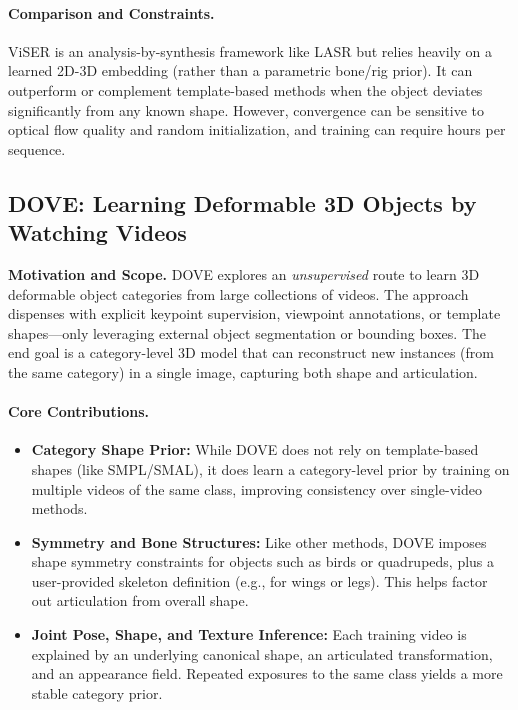 \documentclass[11pt]{article}
\begin{document}
\paragraph{Comparison and Constraints.}
ViSER is an analysis-by-synthesis framework like LASR but relies heavily on a learned 2D-3D embedding (rather than a parametric bone/rig prior). It can outperform or complement template-based methods when the object deviates significantly from any known shape. However, convergence can be sensitive to optical flow quality and random initialization, and training can require hours per sequence.

\subsection{DOVE: Learning Deformable 3D Objects by Watching Videos~\cite{wu2023dove}}
\textbf{Motivation and Scope.}
DOVE explores an \emph{unsupervised} route to learn 3D deformable object categories from large collections of videos. The approach dispenses with explicit keypoint supervision, viewpoint annotations, or template shapes—only leveraging external object segmentation or bounding boxes. The end goal is a category-level 3D model that can reconstruct new instances (from the same category) in a single image, capturing both shape and articulation.

\paragraph{Core Contributions.}
\begin{itemize}
    \item \textbf{Category Shape Prior:} While DOVE does not rely on template-based shapes (like SMPL/SMAL), it does learn a category-level prior by training on multiple videos of the same class, improving consistency over single-video methods.
    \item \textbf{Symmetry and Bone Structures:} Like other methods, DOVE imposes shape symmetry constraints for objects such as birds or quadrupeds, plus a user-provided skeleton definition (e.g., for wings or legs). This helps factor out articulation from overall shape.
    \item \textbf{Joint Pose, Shape, and Texture Inference:} Each training video is explained by an underlying canonical shape, an articulated transformation, and an appearance field. Repeated exposures to the same class yields a more stable category prior.
\end{itemize}
\end{document}
